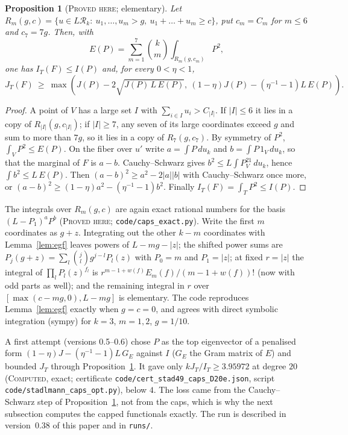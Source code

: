 \documentclass[11pt]{amsart}
\newtheorem{proposition}[theorem]{Proposition}
\theoremstyle{definition}
\theoremstyle{remark}
\newcommand{\lbl}[1]{\textup{\textsc{#1}}}
\newcommand{\R}{\mathcal{R}}
\begin{document}
\begin{proposition}[\lbl{Proved here}; elementary]\label{prop:caps}
Let $R_m(g,c)=\{u\in L\R_k:\ u_1,\dots,u_m>g,\ u_1+\dots+u_m\ge c\}$, put
$c_m=C_m$ for $m\le6$ and $c_7=7g$. Then, with
\[
E(P)=\sum_{m=1}^{7}\binom km\int_{R_m(g,c_m)}P^2 ,
\]
one has $I_T(F)\le I(P)$ and, for every $0<\eta<1$,
\[
J_T(F)\ \ge\ \max\left(J(P)-2\sqrt{J(P)\,L\,E(P)},\ (1-\eta)J(P)-(\eta^{-1}-1)L\,E(P)\right).
\]
\end{proposition}

\begin{proof}
A point of $V$ has a large set $I$ with $\sum_{i\in I}u_i>C_{|I|}$. If
$|I|\le6$ it lies in a copy of $R_{|I|}(g,c_{|I|})$; if $|I|\ge7$, any seven
of its large coordinates exceed $g$ and sum to more than $7g$, so it lies in
a copy of $R_7(g,c_7)$. By symmetry of $P^2$, $\int_VP^2\le E(P)$. On the
fiber over $u'$ write $a=\int P\,du_k$ and $b=\int P\,1_V\,du_k$, so that the
marginal of $F$ is $a-b$. Cauchy--Schwarz gives $b^2\le L\int P^21_V\,du_k$,
hence $\int b^2\le L\,E(P)$. Then $(a-b)^2\ge a^2-2|a||b|$ with
Cauchy--Schwarz once more, or $(a-b)^2\ge(1-\eta)a^2-(\eta^{-1}-1)b^2$.
Finally $I_T(F)=\int_TP^2\le I(P)$.
\end{proof}

The integrals over $R_m(g,c)$ are again exact rational numbers for the basis
$(L-P_1)^aP^b$ (\lbl{Proved here}; \texttt{code/caps\_exact.py}). Write the
first $m$ coordinates as $g+z$. Integrating out the other $k-m$ coordinates
with Lemma~\ref{lem:egf} leaves powers of $L-mg-|z|$; the shifted power sums
are $P_j(g+z)=\sum_l\binom jlg^{j-l}P_l(z)$ with $P_0=m$ and $P_1=|z|$; at
fixed $r=|z|$ the integral of $\prod_lP_l(z)^{f_l}$ is
$r^{m-1+w(f)}E_m(f)/(m-1+w(f))!$ (now with odd parts as well); and the
remaining integral in $r$ over $[\max(c-mg,0),L-mg]$ is elementary. The code
reproduces Lemma~\ref{lem:egf} exactly when $g=c=0$, and agrees with direct
symbolic integration (sympy) for $k=3$, $m=1,2$, $g=1/10$.

A first attempt (versions 0.5--0.6) chose $P$ as the top eigenvector of a
penalised form $(1-\eta)J-(\eta^{-1}-1)L\,G_E$ against $I$ ($G_E$ the Gram
matrix of $E$) and bounded $J_T$ through Proposition~\ref{prop:caps}. It gave
only $kJ_T/I_T\ge3.95972$ at degree $20$ (\lbl{Computed}, exact;
certificate \texttt{code/}\allowbreak\texttt{cert\_stad49\_caps\_D20e.json}, script
\texttt{code/}\allowbreak\texttt{stadlmann\_caps\_opt.py}), below $4$. The loss came from the
Cauchy--Schwarz step of Proposition~\ref{prop:caps}, not from the caps, which
is why the next subsection computes the capped functionals exactly. The run
is described in version~0.38 of this paper and in \texttt{runs/}.
\end{document}
